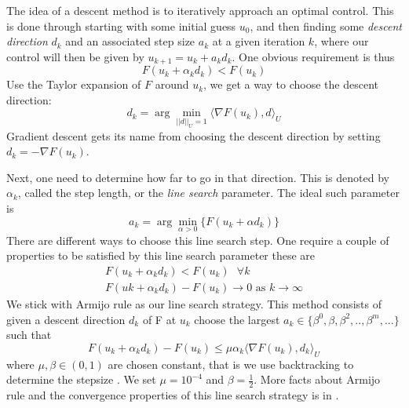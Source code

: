 The idea of a descent method is to iteratively approach an optimal control. This is done through starting with some initial guess $u_0$, and then finding some \emph{descent direction} $d_k$ and an associated step size $a_k$ at a given iteration $k$, where our control will then be given by $u_{k+1} = u_{k} + a_k d_k$. One obvious requirement is thus
\begin{equation*}
    F(u_k + \alpha_kd_k) < F(u_k)
\end{equation*}
Use the Taylor expansion of $F$ around $u_k$, we get a way to choose the descent direction:
\begin{equation*}
    d_k = \arg\min_{||d||_U=1} \langle \nabla F(u_k), d \rangle_U
\end{equation*}
Gradient descent gets its name from choosing the descent direction by setting $d_k = -\nabla F(u_k)$.

Next, one need to determine how far to go in that direction. This is denoted by $\alpha_k$, called the step length, or the \textit{line search} parameter. The ideal such parameter is 
\begin{equation*}
    a_k = \arg \min_{\alpha>0} \{ F(u_k + \alpha d_k) \}
\end{equation*}
There are different ways to choose this line search step. One require a couple of properties to be satisfied by this line search parameter these are
\begin{align*}
    F(u_k + \alpha_kd_k) < F(u_k) \text{  } \forall k \\
    F(uk + \alpha_k d_k) - F(u_k) \rightarrow 0 \text{ as } k\rightarrow \infty
\end{align*}
We stick with Armijo rule as our line search strategy. This method consists of given a descent direction $d_k$ of F at $u_k$ choose the largest $a_k \in \{ \beta^0, \beta, \beta^2,..,\beta^m,... \}$ such that
\begin{equation}\label{eq:armijo}
    F (u_k + \alpha_kd_k) - F(u_k) \leq \mu \alpha_k \langle \nabla F(u_k),d_k \rangle_{U}
\end{equation}
where $\mu,\beta  \in (0,1)$ are chosen constant, that is we use backtracking to determine the stepsize \cite{iterativeMethods}. We set $\mu = 10^{-4}$ and $\beta = \frac{1}{2}$. More facts about Armijo rule and the convergence properties of this line search strategy is in \cite{numMethods, iterativeMethods}.

